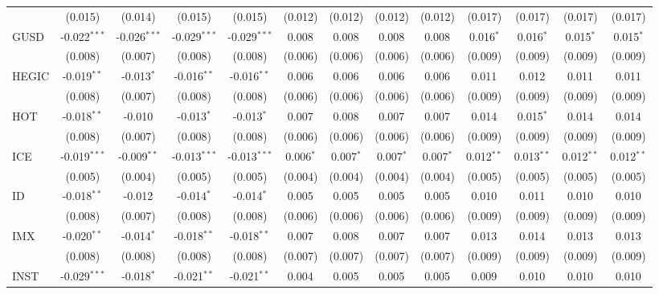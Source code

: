 \begin{table}[!htbp]
\begin{tabular}{@{\extracolsep{5pt}}lcccccccccccc}
  & (0.015) & (0.014) & (0.015) & (0.015) & (0.012) & (0.012) & (0.012) & (0.012) & (0.017) & (0.017) & (0.017) & (0.017) \\
 GUSD & -0.022$^{***}$ & -0.026$^{***}$ & -0.029$^{***}$ & -0.029$^{***}$ & 0.008$^{}$ & 0.008$^{}$ & 0.008$^{}$ & 0.008$^{}$ & 0.016$^{*}$ & 0.016$^{*}$ & 0.015$^{*}$ & 0.015$^{*}$ \\
  & (0.008) & (0.007) & (0.008) & (0.008) & (0.006) & (0.006) & (0.006) & (0.006) & (0.009) & (0.009) & (0.009) & (0.009) \\
 HEGIC & -0.019$^{**}$ & -0.013$^{*}$ & -0.016$^{**}$ & -0.016$^{**}$ & 0.006$^{}$ & 0.006$^{}$ & 0.006$^{}$ & 0.006$^{}$ & 0.011$^{}$ & 0.012$^{}$ & 0.011$^{}$ & 0.011$^{}$ \\
  & (0.008) & (0.007) & (0.008) & (0.008) & (0.006) & (0.006) & (0.006) & (0.006) & (0.009) & (0.009) & (0.009) & (0.009) \\
 HOT & -0.018$^{**}$ & -0.010$^{}$ & -0.013$^{*}$ & -0.013$^{*}$ & 0.007$^{}$ & 0.008$^{}$ & 0.007$^{}$ & 0.007$^{}$ & 0.014$^{}$ & 0.015$^{*}$ & 0.014$^{}$ & 0.014$^{}$ \\
  & (0.008) & (0.007) & (0.008) & (0.008) & (0.006) & (0.006) & (0.006) & (0.006) & (0.009) & (0.009) & (0.009) & (0.009) \\
 ICE & -0.019$^{***}$ & -0.009$^{**}$ & -0.013$^{***}$ & -0.013$^{***}$ & 0.006$^{*}$ & 0.007$^{*}$ & 0.007$^{*}$ & 0.007$^{*}$ & 0.012$^{**}$ & 0.013$^{**}$ & 0.012$^{**}$ & 0.012$^{**}$ \\
  & (0.005) & (0.004) & (0.005) & (0.005) & (0.004) & (0.004) & (0.004) & (0.004) & (0.005) & (0.005) & (0.005) & (0.005) \\
 ID & -0.018$^{**}$ & -0.012$^{}$ & -0.014$^{*}$ & -0.014$^{*}$ & 0.005$^{}$ & 0.005$^{}$ & 0.005$^{}$ & 0.005$^{}$ & 0.010$^{}$ & 0.011$^{}$ & 0.010$^{}$ & 0.010$^{}$ \\
  & (0.008) & (0.007) & (0.008) & (0.008) & (0.006) & (0.006) & (0.006) & (0.006) & (0.009) & (0.009) & (0.009) & (0.009) \\
 IMX & -0.020$^{**}$ & -0.014$^{*}$ & -0.018$^{**}$ & -0.018$^{**}$ & 0.007$^{}$ & 0.008$^{}$ & 0.007$^{}$ & 0.007$^{}$ & 0.013$^{}$ & 0.014$^{}$ & 0.013$^{}$ & 0.013$^{}$ \\
  & (0.008) & (0.008) & (0.008) & (0.008) & (0.007) & (0.007) & (0.007) & (0.007) & (0.009) & (0.009) & (0.009) & (0.009) \\
 INST & -0.029$^{***}$ & -0.018$^{*}$ & -0.021$^{**}$ & -0.021$^{**}$ & 0.004$^{}$ & 0.005$^{}$ & 0.005$^{}$ & 0.005$^{}$ & 0.009$^{}$ & 0.010$^{}$ & 0.010$^{}$ & 0.010$^{}$ \\

\end{tabular}
\end{table}
